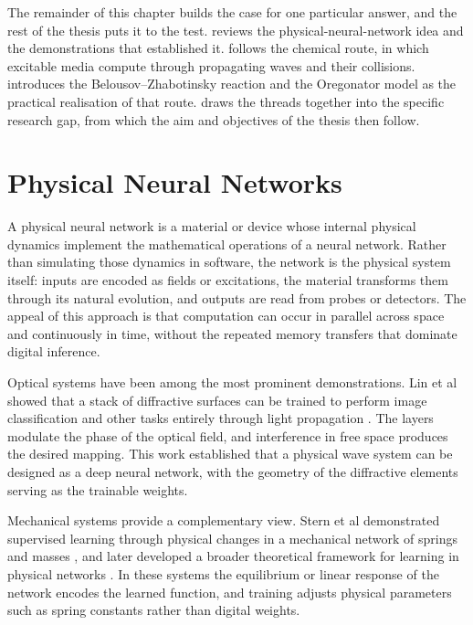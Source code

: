 The remainder of this chapter builds the case for one particular answer, and the rest of the thesis puts it to the test. 
 reviews the physical-neural-network idea and the demonstrations that established it. 
 follows the chemical route, in which excitable media compute through propagating waves and their collisions. 
 introduces the Belousov--Zhabotinsky reaction and the Oregonator model as the practical realisation of that route. 
 draws the threads together into the specific research gap, from which the aim and objectives of the thesis then follow.

\section{Physical Neural Networks}
\label{sec:lit_pnn}

A physical neural network is a material or device whose internal physical dynamics implement the mathematical operations of a neural network. Rather than simulating those dynamics in software, the network is the physical system itself: inputs are encoded as fields or excitations, the material transforms them through its natural evolution, and outputs are read from probes or detectors. The appeal of this approach is that computation can occur in parallel across space and continuously in time, without the repeated memory transfers that dominate digital inference.

Optical systems have been among the most prominent demonstrations. Lin et al showed that a stack of diffractive surfaces can be trained to perform image classification and other tasks entirely through light propagation \cite{lin2018alloptical}. The layers modulate the phase of the optical field, and interference in free space produces the desired mapping. This work established that a physical wave system can be designed as a deep neural network, with the geometry of the diffractive elements serving as the trainable weights.

Mechanical systems provide a complementary view. Stern et al demonstrated supervised learning through physical changes in a mechanical network of springs and masses \cite{stern2020supervised}, and later developed a broader theoretical framework for learning in physical networks \cite{stern2021physical}. In these systems the equilibrium or linear response of the network encodes the learned function, and training adjusts physical parameters such as spring constants rather than digital weights.

